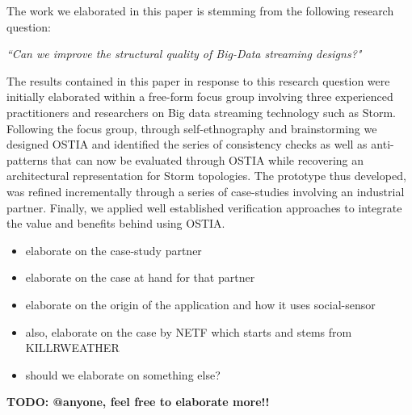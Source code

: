 
The work we elaborated in this paper is stemming from the following research question:

\begin{center}
\emph{``Can we improve the structural quality of Big-Data streaming designs?"}
\end{center}

The results contained in this paper in response to this research question were initially elaborated within a free-form focus group \cite{focusgroup} involving three experienced practitioners and researchers on Big data streaming technology such as Storm. Following the focus group, through self-ethnography \cite{selfeth} and brainstorming we designed OSTIA and identified the series of consistency checks as well as anti-patterns that can now be evaluated through OSTIA while recovering an architectural representation for Storm topologies. The prototype thus developed, was refined incrementally through a series of case-studies \cite{casestudy} involving an industrial partner. Finally, we applied well established verification approaches to integrate the value and benefits behind using OSTIA.

\begin{itemize}
\item elaborate on the case-study partner
\item elaborate on the case at hand for that partner
\item elaborate on the origin of the application and how it uses social-sensor
\item also, elaborate on the case by NETF which starts and stems from KILLRWEATHER
\item should we elaborate on something else?
\end{itemize}
\textbf{TODO: @anyone, feel free to elaborate more!!}

